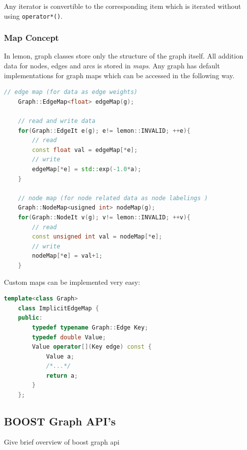    Any iterator is convertible to the corresponding item which
    is iterated without using \lstinline{operator*()}.

\subsubsection{Map Concept}

    In lemon, graph classes store only the structure of the graph itself.
    All addition data for nodes, edges and arcs is stored 
    in \emph{maps}. 
    Any graph has default implementations for graph maps which
    can be accessed in the following way.

    \begin{minipage}{\textwidth}\vspace{-0.75cm}\begin{lstlisting}[language=c++]
    // edge map (for data as edge weights)
    Graph::EdgeMap<float> edgeMap(g); 

    // read and write data 
    for(Graph::EdgeIt e(g); e!= lemon::INVALID; ++e){
        // read
        const float val = edgeMap[*e];
        // write
        edgeMap[*e] = std::exp(-1.0*a);
    }

    // node map (for node related data as node labelings )
    Graph::NodeMap<usigned int> nodeMap(g);
    for(Graph::NodeIt v(g); v!= lemon::INVALID; ++v){
        // read
        const unsigned int val = nodeMap[*e];
        // write
        nodeMap[*e] = val+1;
    }
    \end{lstlisting}\end{minipage}\vspace{0.5cm}


    Custom maps can be implemented very easy:

    \begin{minipage}{\textwidth}\vspace{-0.75cm}\begin{lstlisting}[language=c++]
    template<class Graph>
    class ImplicitEdgeMap {
    public:
        typedef typename Graph::Edge Key;
        typedef double Value;
        Value operator[](Key edge) const { 
            Value a;
            /*...*/
            return a;
        }
    };
    \end{lstlisting}\end{minipage}\vspace{0.5cm}

\subsection{BOOST Graph API's}\label{sec:boost_graph_apis}
Give brief overview of boost graph api
